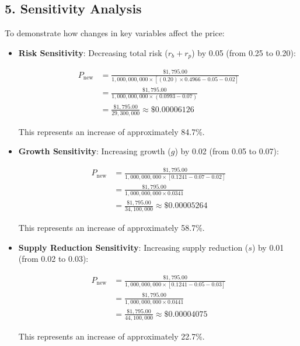 \documentclass[a4paper,12pt]{article}
\begin{document}
\subsection*{5. Sensitivity Analysis}
To demonstrate how changes in key variables affect the price:

\begin{itemize}
    \item \textbf{Risk Sensitivity}: Decreasing total risk (\( r_b + r_p \)) by 0.05 (from 0.25 to 0.20):

    \[
    \begin{align*}
    P_{\text{new}} &= \frac{\$1,795.00}{1,000,000,000 \times \left[ (0.20) \times 0.4966 - 0.05 - 0.02 \right]} \\
    &= \frac{\$1,795.00}{1,000,000,000 \times (0.0993 - 0.07)} \\
    &= \frac{\$1,795.00}{29,300,000} \approx \$0.00006126
    \end{align*}
    \]

    This represents an increase of approximately 84.7\%.

    \item \textbf{Growth Sensitivity}: Increasing growth (\( g \)) by 0.02 (from 0.05 to 0.07):

    \[
    \begin{align*}
    P_{\text{new}} &= \frac{\$1,795.00}{1,000,000,000 \times \left[ 0.1241 - 0.07 - 0.02 \right]} \\
    &= \frac{\$1,795.00}{1,000,000,000 \times 0.0341} \\
    &= \frac{\$1,795.00}{34,100,000} \approx \$0.00005264
    \end{align*}
    \]

    This represents an increase of approximately 58.7\%.

    \item \textbf{Supply Reduction Sensitivity}: Increasing supply reduction (\( s \)) by 0.01 (from 0.02 to 0.03):

    \[
    \begin{align*}
    P_{\text{new}} &= \frac{\$1,795.00}{1,000,000,000 \times \left[ 0.1241 - 0.05 - 0.03 \right]} \\
    &= \frac{\$1,795.00}{1,000,000,000 \times 0.0441} \\
    &= \frac{\$1,795.00}{44,100,000} \approx \$0.00004075
    \end{align*}
    \]

    This represents an increase of approximately 22.7\%.
\end{itemize}
\end{document}
